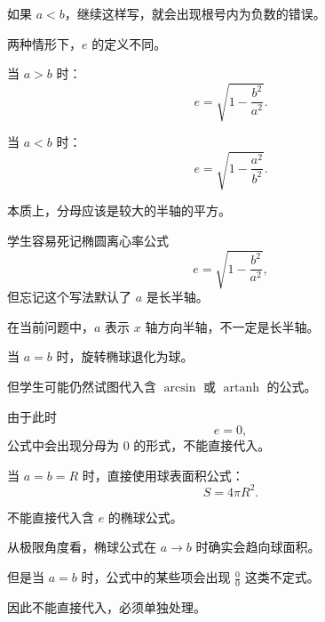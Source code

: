 \begin{trapbox}
\begin{description}[style=nextline, leftmargin=2.8em, labelsep=0.5em, itemsep=0.45em]
		      如果 $a<b$，继续这样写，就会出现根号内为负数的错误。

		\item[\textbf{\textcolor{CTrap}{正确理解：}}]
		      两种情形下，$e$ 的定义不同。

		      当 $a>b$ 时：
		      \[
			      e=\sqrt{1-\frac{b^{2}}{a^{2}}}.
		      \]

		      当 $a<b$ 时：
		      \[
			      e=\sqrt{1-\frac{a^{2}}{b^{2}}}.
		      \]

		      本质上，分母应该是较大的半轴的平方。

		\item[\textbf{\textcolor{CTrap}{错因分析：}}]
		      学生容易死记椭圆离心率公式
		      \[
			      e=\sqrt{1-\frac{b^{2}}{a^{2}}},
		      \]
		      但忘记这个写法默认了 $a$ 是长半轴。

		      在当前问题中，$a$ 表示 $x$ 轴方向半轴，不一定是长半轴。

	\end{description}

	\medskip

	\begin{description}[style=nextline, leftmargin=2.8em, labelsep=0.5em, itemsep=0.45em]

		\item[\textbf{\textcolor{CTrap}{易错点四（忽视退化情形）：}}]
		      当 $a=b$ 时，旋转椭球退化为球。

		      但学生可能仍然试图代入含 $\arcsin$ 或 $\operatorname{artanh}$ 的公式。

		      由于此时
		      \[
			      e=0,
		      \]
		      公式中会出现分母为 $0$ 的形式，不能直接代入。

		\item[\textbf{\textcolor{CTrap}{正确理解：}}]
		      当 $a=b=R$ 时，直接使用球表面积公式：
		      \[
			      S=4\pi R^{2}.
		      \]

		      不能直接代入含 $e$ 的椭球公式。

		\item[\textbf{\textcolor{CTrap}{错因分析：}}]
		      从极限角度看，椭球公式在 $a\to b$ 时确实会趋向球面积。

		      但是当 $a=b$ 时，公式中的某些项会出现 $\frac00$ 这类不定式。

		      因此不能直接代入，必须单独处理。

	\end{description}

\end{trapbox}